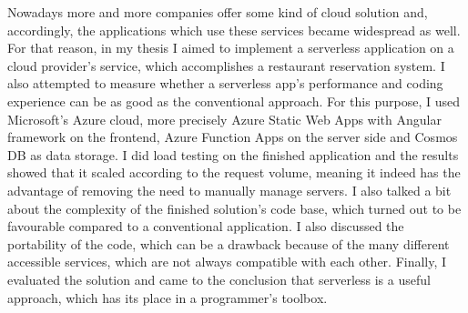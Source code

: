 Nowadays more and more companies offer some kind of cloud solution and, accordingly, the applications which use these services became widespread as well. For that reason, in my thesis I aimed to implement a serverless application on a cloud provider's service, which accomplishes a restaurant reservation system. I also attempted to measure whether a serverless app's performance and coding experience can be as good as the conventional approach. 
For this purpose, I used Microsoft's Azure cloud, more precisely Azure Static Web Apps with Angular framework on the frontend, Azure Function Apps on the server side and Cosmos DB as data storage.
I did load testing on the finished application and the results showed that it scaled according to the request volume, meaning it indeed has the advantage of removing the need to manually manage servers. I also talked a bit about the complexity of the finished solution's code base, which turned out to be favourable compared to a conventional application. I also discussed the portability of the code, which can be a drawback because of the many different accessible services, which are not always compatible with each other.
Finally, I evaluated the solution and came to the conclusion that serverless is a useful approach, which has its place in a programmer's toolbox.

\vfill

